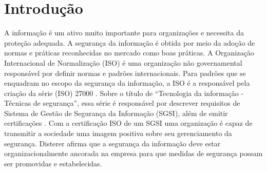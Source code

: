 \chapter{\label{chap:intro}Introdução}
%
%



%
%
%
%
%
   

A informação é um ativo muito importante para organizações e necessita da proteção adequada. A segurança da informação é obtida por meio da adoção de normas e práticas reconhecidas no mercado como boas práticas. A Organização Internacional de Normalização (ISO) é uma organização não governamental responsável por definir normas e padrões internacionais. Para padrões que se enquadram no escopo da segurança da informação, a ISO é a responsável pela criação da série (ISO) 27000 \cite{caio2019}. Sobre o título de “Tecnologia da informação - Técnicas de segurança”, essa série é responsável por descrever requisitos de Sistema de Gestão de Segurança da Informação (SGSI), além de emitir certificações \cite{disterer2013}. Com a certificação ISO de um SGSI uma organização é capaz de transmitir a sociedade uma imagem positiva sobre seu gerenciamento da segurança. Disterer \cite{disterer2013} afirma que a segurança da informação deve estar organizacionalmente ancorada na empresa para que medidas de segurança possam ser promovidas e estabelecidas. 

